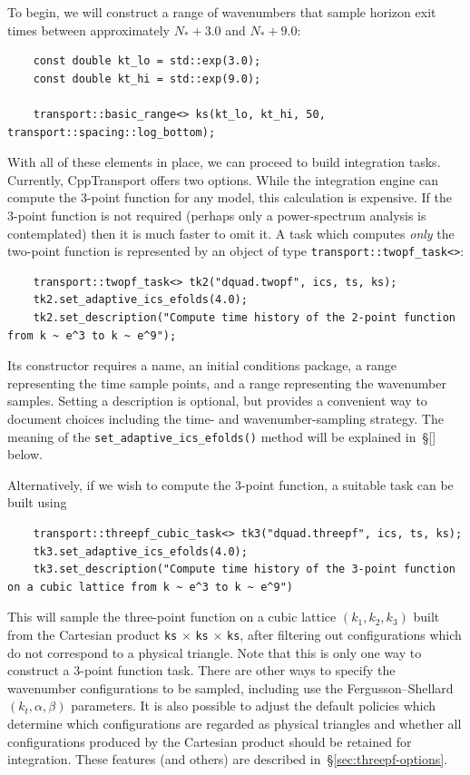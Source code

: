\documentclass[11pt,a4paper]{article}
\newcommand{\Nstar}{N_{\ast}}
\newcommand{\packagefont}{\sffamily}
\newcommand{\CppTransport}{{\packagefont CppTransport}}
\newcommand{\semibold}[1]{{\fontseries{b}\selectfont{#1}}}
\newcommand{\para}[1]{\par\vspace{2mm}\noindent\semibold{{#1.}---}\ignorespaces}
\begin{document}
To begin, we will construct a range of wavenumbers that
sample horizon exit times between approximately
$\Nstar + 3.0$
and
$\Nstar + 9.0$:
\begin{verbatim}
    const double kt_lo = std::exp(3.0);
    const double kt_hi = std::exp(9.0);

    transport::basic_range<> ks(kt_lo, kt_hi, 50, transport::spacing::log_bottom);
\end{verbatim}

\para{Building 2- and 3-point function integration tasks}
With all of these elements in place, we can proceed to build
integration tasks.
Currently, {\CppTransport} offers two options.
While the integration
engine can compute the 3-point function for any model,
this calculation is expensive.
If the 3-point function is not required
(perhaps only a power-spectrum analysis is contemplated)
then it is much faster to omit it.
A task which computes \emph{only} the two-point function
is represented by an object of type
\texttt{transport::twopf_task<>}:
\begin{verbatim}
    transport::twopf_task<> tk2("dquad.twopf", ics, ts, ks);
    tk2.set_adaptive_ics_efolds(4.0);
    tk2.set_description("Compute time history of the 2-point function from k ~ e^3 to k ~ e^9");
\end{verbatim}
Its constructor requires a name, an initial conditions package,
a range representing the time sample points,
and a range representing the wavenumber samples.
Setting a description is optional, but provides a convenient way to document
choices including the time- and wavenumber-sampling strategy.
The meaning of the
\texttt{set_adaptive_ics_efolds()}
method will be explained in~\S\ref{} below.

Alternatively, if we wish to compute the 3-point function,
a suitable task can be built using
\begin{verbatim}
    transport::threepf_cubic_task<> tk3("dquad.threepf", ics, ts, ks);
    tk3.set_adaptive_ics_efolds(4.0);
    tk3.set_description("Compute time history of the 3-point function on a cubic lattice from k ~ e^3 to k ~ e^9")
\end{verbatim}
This will sample the three-point function on a cubic lattice
$(k_1, k_2, k_3)$ built from the Cartesian product
\texttt{ks} $\times$
\texttt{ks} $\times$
\texttt{ks},
after filtering out configurations which do not correspond to
a physical triangle.
Note that
this is only one way to construct a 3-point function task.
There are other ways to specify the wavenumber configurations
to be sampled, including use the
Fergusson--Shellard $(k_t, \alpha, \beta)$ parameters.
It is also possible to adjust the default
policies which determine which configurations
are regarded as physical triangles and whether all
configurations produced by the Cartesian product should
be retained for integration.
These features (and others) are described in~\S\ref{sec:threepf-options}.
\end{document}
